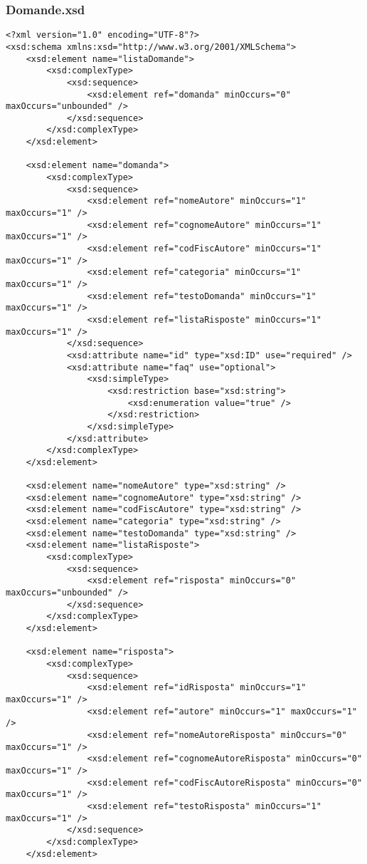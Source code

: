 \documentclass [a4paper, 12pt]{book}
\begin{document}
\subsubsection{Domande.xsd}
\begin{lstlisting}[style=XML]
<?xml version="1.0" encoding="UTF-8"?>
<xsd:schema xmlns:xsd="http://www.w3.org/2001/XMLSchema">
    <xsd:element name="listaDomande">
        <xsd:complexType>
            <xsd:sequence>
                <xsd:element ref="domanda" minOccurs="0" maxOccurs="unbounded" />
            </xsd:sequence>
        </xsd:complexType>
    </xsd:element>

    <xsd:element name="domanda">
        <xsd:complexType>
            <xsd:sequence>
                <xsd:element ref="nomeAutore" minOccurs="1" maxOccurs="1" />
                <xsd:element ref="cognomeAutore" minOccurs="1" maxOccurs="1" />
                <xsd:element ref="codFiscAutore" minOccurs="1" maxOccurs="1" />
                <xsd:element ref="categoria" minOccurs="1" maxOccurs="1" />
                <xsd:element ref="testoDomanda" minOccurs="1" maxOccurs="1" />
                <xsd:element ref="listaRisposte" minOccurs="1" maxOccurs="1" />
            </xsd:sequence>
            <xsd:attribute name="id" type="xsd:ID" use="required" />
            <xsd:attribute name="faq" use="optional">
                <xsd:simpleType>
                    <xsd:restriction base="xsd:string">
                        <xsd:enumeration value="true" />
                    </xsd:restriction>
                </xsd:simpleType>
            </xsd:attribute>
        </xsd:complexType>
    </xsd:element>

    <xsd:element name="nomeAutore" type="xsd:string" />
    <xsd:element name="cognomeAutore" type="xsd:string" />
    <xsd:element name="codFiscAutore" type="xsd:string" />
    <xsd:element name="categoria" type="xsd:string" />
    <xsd:element name="testoDomanda" type="xsd:string" />
    <xsd:element name="listaRisposte">
        <xsd:complexType>
            <xsd:sequence>
                <xsd:element ref="risposta" minOccurs="0" maxOccurs="unbounded" />
            </xsd:sequence>
        </xsd:complexType>
    </xsd:element>

    <xsd:element name="risposta">
        <xsd:complexType>
            <xsd:sequence>
                <xsd:element ref="idRisposta" minOccurs="1" maxOccurs="1" />
                <xsd:element ref="autore" minOccurs="1" maxOccurs="1" />
                <xsd:element ref="nomeAutoreRisposta" minOccurs="0" maxOccurs="1" />
                <xsd:element ref="cognomeAutoreRisposta" minOccurs="0" maxOccurs="1" />
                <xsd:element ref="codFiscAutoreRisposta" minOccurs="0" maxOccurs="1" />
                <xsd:element ref="testoRisposta" minOccurs="1" maxOccurs="1" />
            </xsd:sequence>
        </xsd:complexType>
    </xsd:element>


\end{lstlisting}
\end{document}

